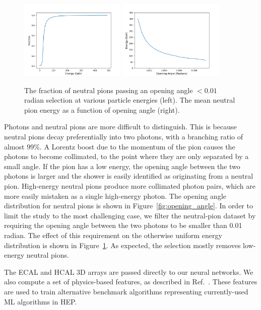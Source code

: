 \begin{figure}[htbp]
    \centering
    \includegraphics[width=0.45\textwidth]{Images/Calo/opening_angle_cut_vs_energy.png}
    \includegraphics[width=0.45\textwidth]{Images/Calo/mean_energy_vs_opening_angle.png}
    \caption{The fraction of neutral pions passing an opening angle $< 0.01$ radian selection at various particle energies (left). The mean neutral pion energy as a function of opening angle (right).}
    \label{fig:opening_angle_energy}
\end{figure}

Photons and neutral pions are more difficult to distinguish. This is because neutral pions decay preferentially into two photons, with a branching ratio of almost $99\%$. A Lorentz boost due to the momentum of the pion causes the photons to become collimated, to the point where they are only separated by a small angle. If the pion has a low energy, the opening angle between the two photons is larger and the shower is easily identified as originating from a neutral pion. High-energy neutral pions produce more collimated photon pairs, which are more easily mistaken as a single high-energy photon. The opening angle distribution for neutral pions is shown in Figure~\ref{fig:opening_angle}. In order to limit the study to the most challenging case, we filter the neutral-pion dataset by requiring the opening angle between the two photons to be smaller than 0.01 radian.  The effect of  this requirement on the otherwise uniform energy distribution is shown in Figure~\ref{fig:opening_angle_energy}. As expected, the selection mostly removes low-energy neutral pions. 

The ECAL and HCAL 3D arrays are passed directly to our neural networks. We also compute a set of physics-based features, as described in Ref.~\cite{NIPS}. These features are used to train alternative benchmark algorithms representing currently-used ML algorithms in HEP.